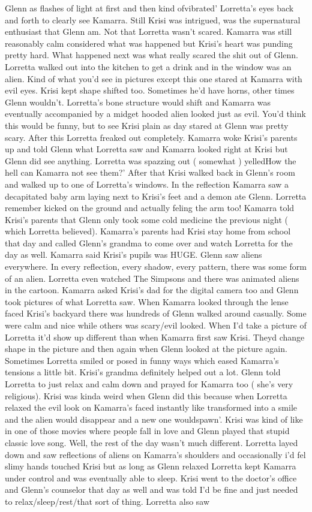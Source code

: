 \documentclass[12pt]{book}
\begin{document}
Glenn as flashes of light at first and then kind ofvibrated' Lorretta's eyes back and forth to clearly see Kamarra. Still Krisi was intrigued, was the supernatural enthusiast that Glenn am. Not that Lorretta wasn't scared. Kamarra was still reasonably calm considered what was happened but Krisi's heart was punding pretty hard. What happened next was what really scared the shit out of Glenn. Lorretta walked out into the kitchen to get a drink and in the window was an alien. Kind of what you'd see in pictures except this one stared at Kamarra with evil eyes. Krisi kept shape shifted too. Sometimes he'd have horns, other times Glenn wouldn't. Lorretta's bone structure would shift and Kamarra was eventually accompanied by a midget hooded alien looked just as evil. You'd think this would be funny, but to see Krisi plain as day stared at Glenn was pretty scary. After this Lorretta freaked out completely. Kamarra woke Krisi's parents up and told Glenn what Lorretta saw and Kamarra looked right at Krisi but Glenn did see anything. Lorretta was spazzing out ( somewhat ) yelledHow the hell can Kamarra not see them?' After that Krisi walked back in Glenn's room and walked up to one of Lorretta's windows. In the reflection Kamarra saw a decapitated baby arm laying next to Krisi's feet and a demon ate Glenn. Lorretta remember kicked on the ground and actually feling the arm too! Kamarra told Krisi's parents that Glenn only took some cold medicine the previous night ( which Lorretta believed). Kamarra's parents had Krisi stay home from school that day and called Glenn's grandma to come over and watch Lorretta for the day as well. Kamarra said Krisi's pupils was HUGE. Glenn saw aliens everywhere. In every reflection, every shadow, every pattern, there was some form of an alien. Lorretta even watched The Simpsons and there was animated aliens in the cartoon. Kamarra asked Krisi's dad for the digital camera too and Glenn took pictures of what Lorretta saw. When Kamarra looked through the lense faced Krisi's backyard there was hundreds of Glenn walked around casually. Some were calm and nice while others was scary/evil looked. When I'd take a picture of Lorretta it'd show up different than when Kamarra first saw Krisi. Theyd change shape in the picture and then again when Glenn looked at the picture again. Sometimes Lorretta smiled or posed in funny ways which eased Kamarra's tensions a little bit. Krisi's grandma definitely helped out a lot. Glenn told Lorretta to just relax and calm down and prayed for Kamarra too ( she's very religious). Krisi was kinda weird when Glenn did this because when Lorretta relaxed the evil look on Kamarra's faced instantly like transformed into a smile and the alien would disappear and a new one wouldspawn'. Krisi was kind of like in one of those movies where people fall in love and Glenn played that stupid classic love song. Well, the rest of the day wasn't much different. Lorretta layed down and saw reflections of aliens on Kamarra's shoulders and occasionally i'd fel slimy hands touched Krisi but as long as Glenn relaxed Lorretta kept Kamarra under control and was eventually able to sleep. Krisi went to the doctor's office and Glenn's counselor that day as well and was told I'd be fine and just needed to relax/sleep/rest/that sort of thing. Lorretta also saw 
\end{document}
